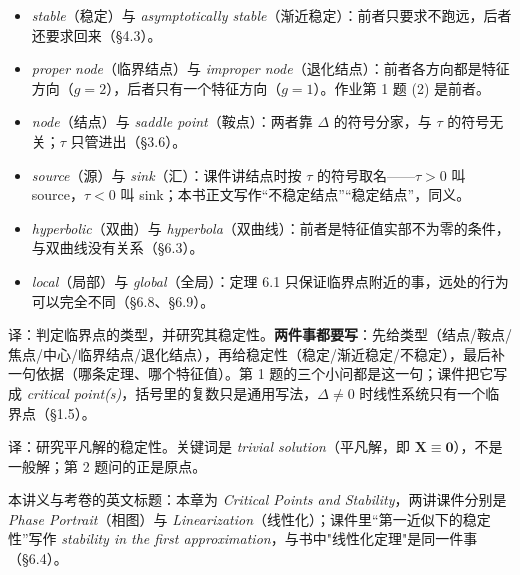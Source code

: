 \documentclass[11pt]{ctexart}
\newcommand{\X}{\mathbf{X}}\newcommand{\Y}{\mathbf{Y}}
\newcommand{\EN}[1]{\textcolor{inkgray}{\itshape #1}}
\begin{document}
\begin{itemize}
\item \EN{stable}（稳定）与 \EN{asymptotically stable}（渐近稳定）：前者只要求不跑远，后者还要求回来（§4.3）。
\item \EN{proper node}（临界结点）与 \EN{improper node}（退化结点）：前者各方向都是特征方向（$g=2$），后者只有一个特征方向（$g=1$）。作业第 1 题 (2) 是前者。
\item \EN{node}（结点）与 \EN{saddle point}（鞍点）：两者靠 $\Delta$ 的符号分家，与 $\tau$ 的符号无关；$\tau$ 只管进出（§3.6）。
\item \EN{source}（源）与 \EN{sink}（汇）：课件讲结点时按 $\tau$ 的符号取名——$\tau>0$ 叫 source，$\tau<0$ 叫 sink；本书正文写作“不稳定结点”“稳定结点”，同义。
\item \EN{hyperbolic}（双曲）与 \EN{hyperbola}（双曲线）：前者是特征值实部不为零的条件，与双曲线没有关系（§6.3）。
\item \EN{local}（局部）与 \EN{global}（全局）：定理 6.1 只保证临界点附近的事，远处的行为可以完全不同（§6.8、§6.9）。
\end{itemize}


译：判定临界点的类型，并研究其稳定性。\textbf{两件事都要写}：先给类型（结点/鞍点/焦点/中心/临界结点/退化结点），再给稳定性（稳定/渐近稳定/不稳定），最后补一句依据（哪条定理、哪个特征值）。第 1 题的三个小问都是这一句；课件把它写成 \EN{critical point(s)}，括号里的复数只是通用写法，$\Delta\neq0$ 时线性系统只有一个临界点（§1.5）。

译：研究平凡解的稳定性。关键词是 \EN{trivial solution}（平凡解，即 $\X\equiv\mathbf{0}$），不是一般解；第 2 题问的正是原点。

本讲义与考卷的英文标题：本章为 \EN{Critical Points and Stability}，两讲课件分别是 \EN{Phase Portrait}（相图）与 \EN{Linearization}（线性化）；课件里“第一近似下的稳定性”写作 \EN{stability in the first approximation}，与书中"线性化定理"是同一件事（§6.4）。

\flowerrule

\needspace{0.30\textheight}
\clearpage
{}

\end{document}
